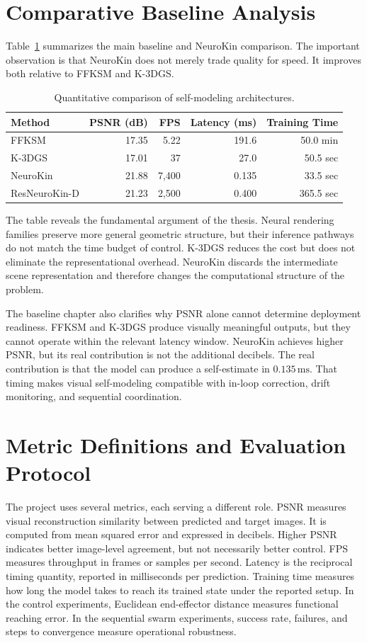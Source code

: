 \documentclass[12pt,a4paper,oneside]{report}
\begin{document}
\section{Comparative Baseline Analysis}

Table~\ref{tab:baseline_metrics} summarizes the main baseline and NeuroKin comparison. The important observation is that NeuroKin does not merely trade quality for speed. It improves both relative to FFKSM and K-3DGS.

\begin{table}[H]
\centering
\caption{Quantitative comparison of self-modeling architectures.}
\label{tab:baseline_metrics}
\begin{tabular}{lrrrr}
\toprule
Method & PSNR (dB) & FPS & Latency (ms) & Training Time \\
\midrule
FFKSM & 17.35 & 5.22 & 191.6 & 50.0 min \\
K-3DGS & 17.01 & 37 & 27.0 & 50.5 sec \\
NeuroKin & 21.88 & 7,400 & 0.135 & 33.5 sec \\
ResNeuroKin-D & 21.23 & 2,500 & 0.400 & 365.5 sec \\
\bottomrule
\end{tabular}
\end{table}

The table reveals the fundamental argument of the thesis. Neural rendering families preserve more general geometric structure, but their inference pathways do not match the time budget of control. K-3DGS reduces the cost but does not eliminate the representational overhead. NeuroKin discards the intermediate scene representation and therefore changes the computational structure of the problem.

The baseline chapter also clarifies why PSNR alone cannot determine deployment readiness. FFKSM and K-3DGS produce visually meaningful outputs, but they cannot operate within the relevant latency window. NeuroKin achieves higher PSNR, but its real contribution is not the additional decibels. The real contribution is that the model can produce a self-estimate in $0.135\,\mathrm{ms}$. That timing makes visual self-modeling compatible with in-loop correction, drift monitoring, and sequential coordination.

\section{Metric Definitions and Evaluation Protocol}

The project uses several metrics, each serving a different role. PSNR measures visual reconstruction similarity between predicted and target images. It is computed from mean squared error and expressed in decibels. Higher PSNR indicates better image-level agreement, but not necessarily better control. FPS measures throughput in frames or samples per second. Latency is the reciprocal timing quantity, reported in milliseconds per prediction. Training time measures how long the model takes to reach its trained state under the reported setup. In the control experiments, Euclidean end-effector distance measures functional reaching error. In the sequential swarm experiments, success rate, failures, and steps to convergence measure operational robustness.
\end{document}
